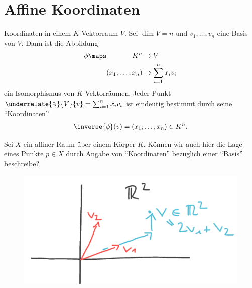 \section{Affine Koordinaten}
Koordinaten in einem \( K \)-Vektorraum \( V \). Sei \( \dim{V}=n \) und \( v_1,\dotsc , v_n \) eine Basis von \( V \). Dann ist die Abbildung
\begin{align*}
    \phi\maps  \begin{aligned}[t]
        K^n&\to V\\
        (x_1,\dotsc,x_n)&\mapsto \sum\limits_{i=1}^{n}x_i v_i
    \end{aligned}
\end{align*}
ein Isomorphismus von \( K \)-Vektorräumen. Jeder Punkt \( \underrelate{\ni}{V}{v}=\sum_{i=1}^{n}x_i v_i \) ist eindeutig bestimmt durch seine \enquote{Koordinaten}
\begin{align*}
    \inverse{\phi}(v)=(x_1,\dotsc,x_n)\in K^n.
\end{align*}
\begin{frage*}
    Sei \( X \) ein affiner Raum über einem Körper \( K \). Können wir auch hier die Lage eines Punkte \( p\in X \) durch Angabe von \enquote{Koordinaten} bezüglich einer \enquote{Basis} beschreibe?
    \begin{figure}[H]
        \centering
        \includegraphics[width=0.5\linewidth]{figures/affine_koordinaten_r_2_hoffnung}
        \label{fig:affine_koordinaten_r_2_hoffnung}
    \end{figure}
    
\end{frage*}
